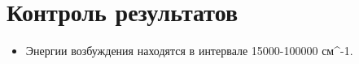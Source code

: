 \section{Контроль результатов}
\begin{itemize}
    \item Энергии возбуждения находятся в интервале 15000-100000 см^{-1}.
\end{itemize}{}